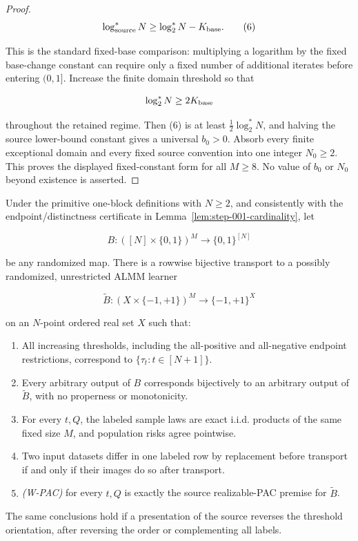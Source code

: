 \begin{proof}
\[
\log^*_{\rm source}N
\ge \log_2^*N-K_{\rm base}.
\tag{6}
\]

This is the standard fixed-base comparison: multiplying a logarithm by the fixed base-change constant can require only a fixed number of additional iterates before entering \((0,1]\). Increase the finite domain threshold so that

\[
\log_2^*N\ge2K_{\rm base}
\]

throughout the retained regime. Then (6) is at least \(\frac12\log_2^*N\), and halving the source lower-bound constant gives a universal \(b_0>0\). Absorb every finite exceptional domain and every fixed source convention into one integer \(N_0\ge2\). This proves the displayed fixed-constant form for all \(M\ge8\). No value of \(b_0\) or \(N_0\) beyond existence is asserted. \end{proof}

\begin{lemma}\label{lem:step-002-transport}
Under the primitive one-block definitions with \(N\ge2\), and consistently with the endpoint/distinctness certificate in Lemma~\ref{lem:step-001-cardinality}, let

\[
B:([N]\times\{0,1\})^M\longrightarrow\{0,1\}^{[N]}
\]

be any randomized map. There is a rowwise bijective transport to a possibly randomized, unrestricted ALMM learner

\[
\widetilde B:(X\times\{-1,+1\})^M
\longrightarrow\{-1,+1\}^{X}
\]

on an \(N\)-point ordered real set \(X\) such that:

\begin{enumerate}
\item All increasing thresholds, including the all-positive and all-negative
endpoint restrictions, correspond to \(\{\tau_t:t\in[N+1]\}\).
\item Every arbitrary output of \(B\) corresponds bijectively to an
arbitrary output of \(\widetilde B\), with no properness or monotonicity.
\item For every \(t,Q\), the labeled sample laws are exact i.i.d. products
of the same fixed size \(M\), and population risks agree pointwise.
\item Two input datasets differ in one labeled row by replacement before
transport if and only if their images do so after transport.
\item \emph{(W-PAC)} for every \(t,Q\) is exactly the source realizable-PAC
premise for \(\widetilde B\).
\end{enumerate}

The same conclusions hold if a presentation of the source reverses the threshold orientation, after reversing the order or complementing all labels.
\end{lemma}


